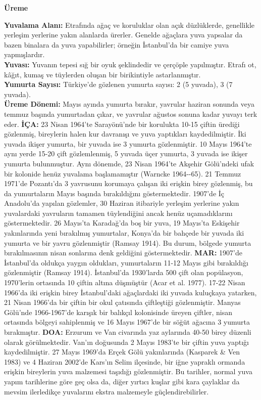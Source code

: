 \documentclass[
  letterpaper,
  DIV=11,
  numbers=noendperiod]{scrreprt}
\begin{document}
\textbf{Üreme}

\textbf{Yuvalama Alanı:} Etrafında ağaç ve koruluklar olan açık
düzlüklerde, genellikle yerleşim yerlerine yakın alanlarda ürerler.
Genelde ağaçlara yuva yapsalar da bazen binalara da yuva yapabilirler;
örneğin İstanbul'da bir camiye yuva yapmışlardır.\\
\textbf{Yuvası:} Yuvanın tepesi sığ bir oyuk şeklindedir ve çerçöple
yapılmıştır. Etrafı ot, kâğıt, kumaş ve tüylerden oluşan bir
birikintiyle astarlanmıştır.\\
\textbf{Yumurta Sayısı:} Türkiye'de gözlenen yumurta sayısı: 2 (5
yuvada), 3 (7 yuvada).\\
\textbf{Üreme Dönemi:} Mayıs ayında yumurta bırakır, yavrular haziran
sonunda veya temmuz başında yumurtadan çıkar, ve yavrular ağustos sonuna
kadar yuvayı terk eder. \textbf{İÇA:} 23 Nisan 1964'te Sarayönü'nde bir
korulukta 10-15 çiftin ürediği gözlenmiş, bireylerin halen kur davranışı
ve yuva yaptıkları kaydedilmiştir. İki yuvada ikişer yumurta, bir yuvada
ise 3 yumurta gözlenmiştir. 10 Mayıs 1964'te aynı yerde 15-20 çift
gözlemlenmiş, 5 yuvada üçer yumurta, 3 yuvada ise ikişer yumurta
bulunmuştur. Aynı dönemde, 23 Nisan 1964'te Akşehir Gölü'ndeki ufak bir
kolonide henüz yuvalama başlamamıştır (Warncke 1964-\/-65). 21 Temmuz
1971'de Pozantı'da 3 yavrusunu korumaya çalışan iki erişkin birey
gözlenmiş, bu da yumurtaların Mayıs başında bırakıldığını
göstermektedir. 1907'de İç Anadolu'da yapılan gözlemler, 30 Haziran
itibariyle yerleşim yerlerine yakın yuvalardaki yavruların tamamen
tüylendiğini ancak henüz uçamadıklarını göstermektedir. 26 Mayıs'ta
Karadağ'da boş bir yuva, 19 Mayıs'ta Eskişehir yakınlarında yeni
bırakılmış yumurtalar, Konya'da bir bahçede bir yuvada iki yumurta ve
bir yavru gözlenmiştir (Ramsay 1914). Bu durum, bölgede yumurta
bırakılmasının nisan sonlarına denk geldiğini göstermektedir.
\textbf{MAR:} 1907'de İstanbul'da oldukça yaygın oldukları, yumurtaların
11-12 Mayıs gibi bırakıldığı gözlenmiştir (Ramsay 1914). İstanbul'da
1930'larda 500 çift olan popülasyon, 1970'lerin ortasında 10 çiftin
altına düşmüştür (Acar et al. 1977). 17-22 Nisan 1966'da iki erişkin
birey İstanbul'daki ağaçlardaki iki yuvada kuluçkaya yatarken, 21 Nisan
1966'da bir çiftin bir okul çatısında çiftleştiği gözlenmiştir. Manyas
Gölü'nde 1966-1967'de karışık bir balıkçıl kolonisinde üreyen çiftler,
nisan ortasında bölgeyi sahiplenmiş ve 16 Mayıs 1967'de bir söğüt
ağacına 3 yumurta bırakmıştır. \textbf{DOA:} Erzurum ve Van civarında
yaz aylarında 40-50 birey düzenli olarak görülmektedir. Van'ın doğusunda
2 Mayıs 1983'te bir çiftin yuva yaptığı kaydedilmiştir. 27 Mayıs 1969'da
Erçek Gölü yakınlarında (Kasparek \& Ven 1983) ve 4 Haziran 2002'de
Kars'ın Selim ilçesinde, bir iğne yapraklı ormanda erişkin bireylerin
yuva malzemesi taşıdığı gözlenmiştir. Bu tarihler, normal yuva yapım
tarihlerine göre geç olsa da, diğer yırtıcı kuşlar gibi kara çaylaklar
da mevsim ilerledikçe yuvalarını ekstra malzemeyle güçlendirebilirler.
\end{document}
